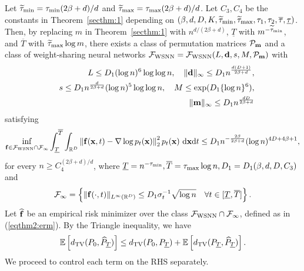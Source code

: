 \documentclass[twoside,11pt]{article}
\def\cF{\mathcal F}
\def\cN{\mathcal N}
\def\cP{\mathcal P}
\newcommand{\bB}{{\bf B}}
\newcommand{\bd}{{\bf d}}
\newcommand{\bff}{{\bf f}}
\newcommand{\bfm}{{\bf m}}
\newcommand{\bx}{{\bf x}}
\newcommand{\bY}{{\bf Y}}
\newcommand{\bbE}{{\mathbb E}}
\newcommand{\bbI}{{\mathbb I}}
\newcommand{\bbR}{{\mathbb R}}
\newcommand{\be}{\begin{equation}}
\newcommand{\ee}{\end{equation}}
\newcommand{\bean}{\setlength\arraycolsep{1pt}\begin{eqnarray*}}
\newcommand{\eean}{\end{eqnarray*}}
\def\d{{\rm d}}
\begin{document}
Let $\widetilde \tau_{\rm min} = \tau_{\rm min} (2\beta + d) / d$ and $\widetilde \tau_{\rm max} = \tau_{\rm max}  (2\beta + d) / d$.
Let $C_{3}, C_{4} $ be the constants in Theorem~\ref{secthm:1} depending on $(\beta,d,D,K,\widetilde \tau_{\rm min},\widetilde \tau_{\rm max}, \tau_{1}, \tau_{2}, \overline{\tau}, \underline{\tau})$.
Then, by replacing $m$ in Theorem~\ref{secthm:1} with $n^{d / (2\beta+d)}$, $\underline{T} $ with $m^{- \widetilde \tau_{\rm min}}$, and $\overline{T}$ with $\widetilde \tau_{\rm max} \log m$, there exists a class of permutation matrices $\cP_{\bfm} $ and a class of weight-sharing neural networks $ \cF_{\rm WSNN} =  \cF_{\rm WSNN} (L,\bd,s,M,\cP_{\bfm})$ with
\bean
&& L \leq D_{1} ( \log n )^{6} \log \log n , \quad \| \bd\|_{\infty} \leq D_{1}  n^{\frac{d (D+1) }{2\beta + d}},
\\
&& s \leq D_{1}  n^{\frac{d}{2\beta + d}}  (\log n)^{5} \log \log n, \quad M \leq \exp(D_{1}  \{ \log n \}^6 ),
\\
&& \| \bfm \|_{\infty} \leq D_{1}  n^{\frac{dD}{2\beta + d}}
\eean
satisfying
\be
\inf_{  \bff \in \cF_{\rm WSNN} \cap \cF_{\infty} } \int_{\underline{T}}^{\overline{T}} \int_{\bbR^{D}} \left\| \bff(\bx,t) - \nabla \log p_{t}(\bx)  \right\|_2^2 p_t(\bx) \ \d \bx \d t
\leq D_{1}  n^{-\frac{2\beta}{2\beta + d}} (\log n )^{ 4D+ 4\beta +1 }, \label{eqthm2:approx}
\ee
for every $n \geq C_{4}^{(2\beta + d) / d}$, where $\underline{T} = n^{-\tau_{\rm min}}, \overline{T} = \tau_{\rm max} \log n, D_{1} = D_{1}(\beta, d, D, C_{3})$ and
\bean
\cF_{\infty}
=
\left\{ \| \bff(\cdot, t) \|_{L^\infty(\bbR^{D})} \leq D_{1}  \sigma_{t}^{-1} \sqrt{ \log n} \quad \forall t \in [\underline{T}, \overline{T}]  \right\}.
\eean
Let $\widehat \bff$ be an empirical risk minimizer over the class $\cF_{\rm WSNN} \cap \cF_{\infty}$, defined as in (\ref{eqthm2:erm}).
By the Triangle inequality, we have
\be
\bbE \left[ d_{\rm TV}(P_{0}, \widehat P_{\underline{T}} ) \right]
\leq d_{\rm TV}(P_{0}, P_{\underline{T}})  
+ \bbE \left[ d_{\rm TV}( P_{\underline{T}},  \widehat P_{\underline{T}}) \right]. \label{eqthm2:pftriangle}
\ee
We proceed to control each term on the RHS separately.
\end{document}
